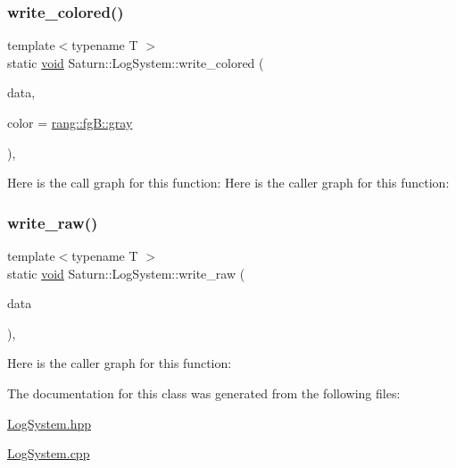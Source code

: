 \subsubsection{\texorpdfstring{write\+\_\+colored()}{write\_colored()}}
{\footnotesize\ttfamily template$<$typename T $>$ \\
static \mbox{\hyperlink{glad_8h_a950fc91edb4504f62f1c577bf4727c29}{void}} Saturn\+::\+Log\+System\+::write\+\_\+colored (\begin{DoxyParamCaption}\item[{T const \&}]{data,  }\item[{\mbox{\hyperlink{namespacerang_a3b83d0d73d49b5a75c3b92031f2c77ee}{rang\+::fgB}}}]{color = {\ttfamily \mbox{\hyperlink{namespacerang_a41a68f6ed991b29fa720fcfbcd319ef9acda7a650c5856cf2f6738072447d7825}{rang\+::fg\+B\+::gray}}} }\end{DoxyParamCaption})\hspace{0.3cm}{\ttfamily [inline]}, {\ttfamily [static]}}

Here is the call graph for this function\+:
Here is the caller graph for this function\+:
\mbox{\label{class_saturn_1_1_log_system_a9d333bbbee49a558628d431b7d4121e9}} 
\subsubsection{\texorpdfstring{write\+\_\+raw()}{write\_raw()}}
{\footnotesize\ttfamily template$<$typename T $>$ \\
static \mbox{\hyperlink{glad_8h_a950fc91edb4504f62f1c577bf4727c29}{void}} Saturn\+::\+Log\+System\+::write\+\_\+raw (\begin{DoxyParamCaption}\item[{T const \&}]{data }\end{DoxyParamCaption})\hspace{0.3cm}{\ttfamily [inline]}, {\ttfamily [static]}}

Here is the caller graph for this function\+:


The documentation for this class was generated from the following files\+:\begin{DoxyCompactItemize}
\item 
\mbox{\hyperlink{_log_system_8hpp}{Log\+System.\+hpp}}\item 
\mbox{\hyperlink{_log_system_8cpp}{Log\+System.\+cpp}}\end{DoxyCompactItemize}
